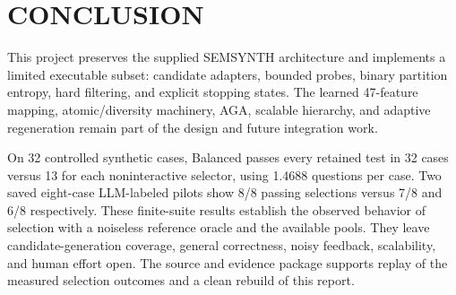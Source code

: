 \section{CONCLUSION}\label{sec:conclusion}
This project preserves the supplied SEMSYNTH architecture and implements a limited executable subset: candidate adapters, bounded probes, binary partition entropy, hard filtering, and explicit stopping states. The learned 47-feature mapping, atomic/diversity machinery, AGA, scalable hierarchy, and adaptive regeneration remain part of the design and future integration work.

On 32 controlled synthetic cases, Balanced passes every retained test in 32 cases versus 13 for each noninteractive selector, using 1.4688 questions per case. Two saved eight-case LLM-labeled pilots show 8/8 passing selections versus 7/8 and 6/8 respectively. These finite-suite results establish the observed behavior of selection with a noiseless reference oracle and the available pools. They leave candidate-generation coverage, general correctness, noisy feedback, scalability, and human effort open. The source and evidence package supports replay of the measured selection outcomes and a clean rebuild of this report.
